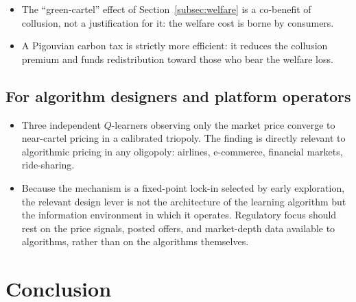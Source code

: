 \begin{itemize}\itemsep2pt

  \item The ``green-cartel'' effect of Section~\ref{subsec:welfare} is a
        co-benefit of collusion, not a justification for it:
        the welfare cost is borne by consumers.

  \item A Pigouvian carbon tax is strictly more efficient: it
        reduces the collusion premium and funds redistribution
        toward those who bear the welfare loss.

\end{itemize}

\subsection*{For algorithm designers and platform operators}

\begin{itemize}\itemsep2pt

  \item Three independent $Q$-learners observing only the
        market price converge to near-cartel pricing in a
        calibrated triopoly. The finding is directly relevant
        to algorithmic pricing in any oligopoly: airlines,
        e-commerce, financial markets, ride-sharing.

  \item Because the mechanism is a fixed-point lock-in selected
        by early exploration, the relevant design lever is not
        the architecture of the learning algorithm but the
        information environment in which it operates.
        Regulatory focus should rest on the price signals,
        posted offers, and market-depth data available to
        algorithms, rather than on the algorithms themselves.

\end{itemize}

\section{Conclusion}
\label{sec:conclusion}

